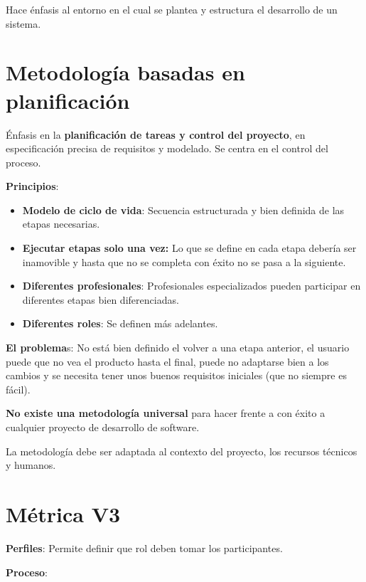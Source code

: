 \documentclass[12pt, twoside, openright]{report} %
\begin{document}
Hace énfasis al entorno en el cual se plantea y estructura el desarrollo
de un sistema.

\section{Metodología basadas en planificación}

Énfasis en la \textbf{planificación de tareas y control del proyecto},
en especificación precisa de requisitos y modelado. Se centra en el
control del proceso.

\textbf{Principios}:

\begin{itemize}

\item
  \textbf{Modelo de ciclo de vida}: Secuencia estructurada y bien
  definida de las etapas necesarias.
\item
  \textbf{Ejecutar etapas solo una vez:} Lo que se define en cada etapa
  debería ser inamovible y hasta que no se completa con éxito no se pasa
  a la siguiente.
\item
  \textbf{Diferentes profesionales}: Profesionales especializados pueden
  participar en diferentes etapas bien diferenciadas.
\item
  \textbf{Diferentes roles}: Se definen más adelantes.
\end{itemize}

\textbf{El problema}s: No está bien definido el volver a una etapa
anterior, el usuario puede que no vea el producto hasta el final, puede
no adaptarse bien a los cambios y se necesita tener unos buenos
requisitos iniciales (que no siempre es fácil).

\textbf{No existe una metodología universal} para hacer frente a con
éxito a cualquier proyecto de desarrollo de software.

La metodología debe ser adaptada al contexto del proyecto, los recursos
técnicos y humanos.

\section{Métrica V3}

\textbf{Perfiles}: Permite definir que rol deben tomar los
participantes.

\textbf{Proceso}:
\end{document}
